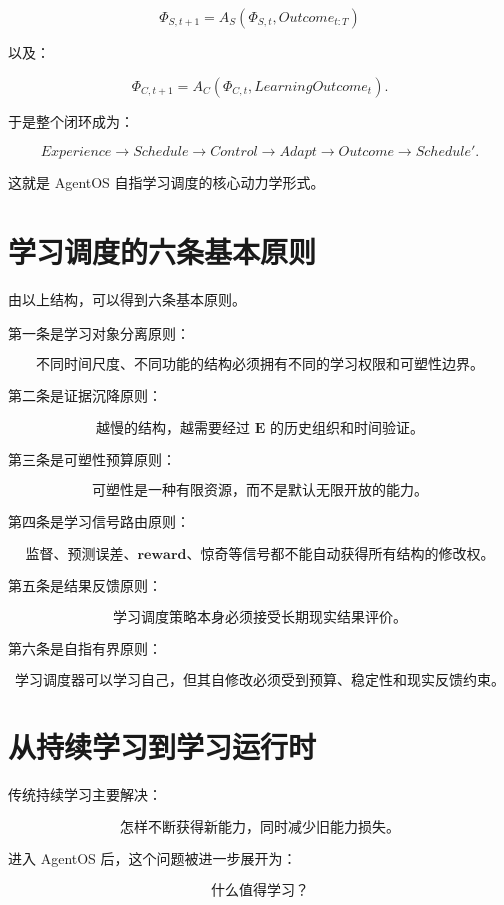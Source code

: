 \[
\boxed{
\Phi_{S,t+1}
=
A_S
(
\Phi_{S,t},
Outcome_{t:T}
)
}
\]

以及：

\[
\boxed{
\Phi_{C,t+1}
=
A_C
(
\Phi_{C,t},
LearningOutcome_t
).
}
\]

于是整个闭环成为：

\[
\boxed{
Experience
\rightarrow
Schedule
\rightarrow
Control
\rightarrow
Adapt
\rightarrow
Outcome
\rightarrow
Schedule'.
}
\]

这就是 AgentOS 自指学习调度的核心动力学形式。


\section{学习调度的六条基本原则}

由以上结构，可以得到六条基本原则。

第一条是学习对象分离原则：

\[
\boxed{
\textbf{
不同时间尺度、不同功能的结构必须拥有不同的学习权限和可塑性边界。
}
}
\]

第二条是证据沉降原则：

\[
\boxed{
\textbf{
越慢的结构，越需要经过 E 的历史组织和时间验证。
}
}
\]

第三条是可塑性预算原则：

\[
\boxed{
\textbf{
可塑性是一种有限资源，而不是默认无限开放的能力。
}
}
\]

第四条是学习信号路由原则：

\[
\boxed{
\textbf{
监督、预测误差、reward、惊奇等信号都不能自动获得所有结构的修改权。
}
}
\]

第五条是结果反馈原则：

\[
\boxed{
\textbf{
学习调度策略本身必须接受长期现实结果评价。
}
}
\]

第六条是自指有界原则：

\[
\boxed{
\textbf{
学习调度器可以学习自己，但其自修改必须受到预算、稳定性和现实反馈约束。
}
}
\]


\section{从持续学习到学习运行时}

传统持续学习主要解决：

\[
\boxed{
\text{怎样不断获得新能力，同时减少旧能力损失。}
}
\]

进入 AgentOS 后，这个问题被进一步展开为：

\[
\boxed{
\text{什么值得学习？}
}
\]

